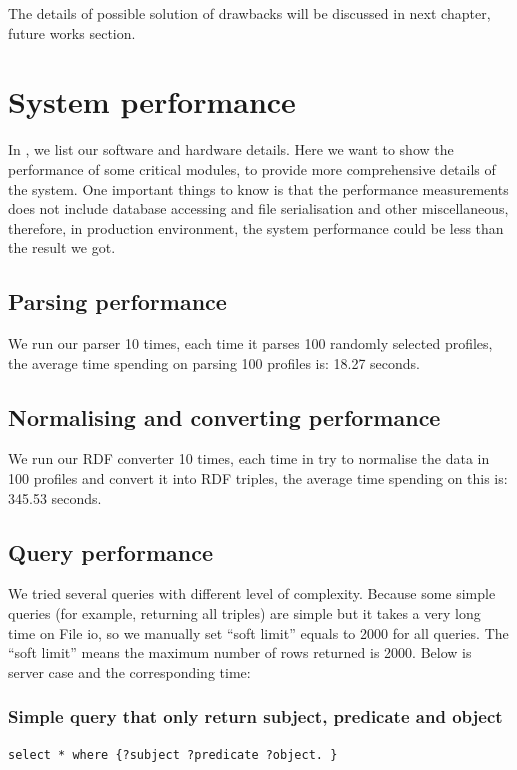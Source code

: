 The details of possible solution of drawbacks will be discussed in next chapter, future works section.

\section{System performance}

In , we list our software and hardware details. Here we want to show the performance of some critical modules, to provide more comprehensive details of the system. One important things to know is that the performance measurements does not include database accessing and file serialisation and other miscellaneous, therefore, in production environment, the system performance could be less than the result we got.

\subsection{Parsing performance}
We run our parser 10 times, each time it parses 100 randomly selected profiles, the average time spending on parsing 100 profiles is: 18.27 seconds.

\subsection{Normalising and converting performance}
We run our RDF converter 10 times, each time in try to normalise the data in 100 profiles and convert it into RDF triples, the average time spending on this is: 345.53 seconds.

\subsection{Query performance}
We tried several queries with different level of complexity. Because some simple queries (for example, returning all triples) are simple but it takes a very long time on File \acrshort{io}, so we manually set ``soft limit'' equals to 2000 for all queries. The ``soft limit'' means the maximum number of rows returned is 2000. Below is server case and the corresponding time:

\subsubsection{Simple query that only return subject, predicate and object}

\begin{Verbatim}[frame=single]
	select * where {?subject ?predicate ?object. }
\end{Verbatim}

